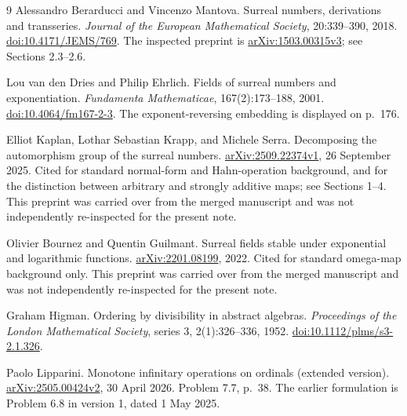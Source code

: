 \documentclass[11pt,letterpaper]{article}
\theoremstyle{definition}
\theoremstyle{remark}
\begin{document}
\clearpage
{}
{}
\begin{thebibliography}{9}
Alessandro Berarducci and Vincenzo Mantova.
\newblock Surreal numbers, derivations and transseries.
\newblock \emph{Journal of the European Mathematical Society}, 20:339--390, 2018.
\newblock \href{https://doi.org/10.4171/JEMS/769}{doi:10.4171/JEMS/769}.
The inspected preprint is \href{https://arxiv.org/abs/1503.00315v3}{arXiv:1503.00315v3};
see Sections 2.3--2.6.

Lou van den Dries and Philip Ehrlich.
\newblock Fields of surreal numbers and exponentiation.
\newblock \emph{Fundamenta Mathematicae}, 167(2):173--188, 2001.
\newblock \href{https://doi.org/10.4064/fm167-2-3}{doi:10.4064/fm167-2-3}.
The exponent-reversing embedding is displayed on p.~176.

Elliot Kaplan, Lothar Sebastian Krapp, and Michele Serra.
\newblock Decomposing the automorphism group of the surreal numbers.
\newblock \href{https://arxiv.org/abs/2509.22374v1}{arXiv:2509.22374v1},
26 September 2025.
\newblock Cited for standard normal-form and Hahn-operation background, and for
the distinction between arbitrary and strongly additive maps; see Sections
1--4. This preprint was carried over from the merged manuscript and was not
independently re-inspected for the present note.

Olivier Bournez and Quentin Guilmant.
\newblock Surreal fields stable under exponential and logarithmic functions.
\newblock \href{https://arxiv.org/abs/2201.08199}{arXiv:2201.08199}, 2022.
\newblock Cited for standard omega-map background only. This preprint was
carried over from the merged manuscript and was not independently
re-inspected for the present note.

Graham Higman.
\newblock Ordering by divisibility in abstract algebras.
\newblock \emph{Proceedings of the London Mathematical Society},
series 3, 2(1):326--336, 1952.
\newblock \href{https://doi.org/10.1112/plms/s3-2.1.326}{doi:10.1112/plms/s3-2.1.326}.

Paolo Lipparini.
\newblock Monotone infinitary operations on ordinals (extended version).
\newblock \href{https://arxiv.org/abs/2505.00424v2}{arXiv:2505.00424v2},
30 April 2026.
\newblock Problem 7.7, p.~38. The earlier formulation is Problem 6.8 in
version 1, dated 1 May 2025.
\end{thebibliography}
\end{document}
